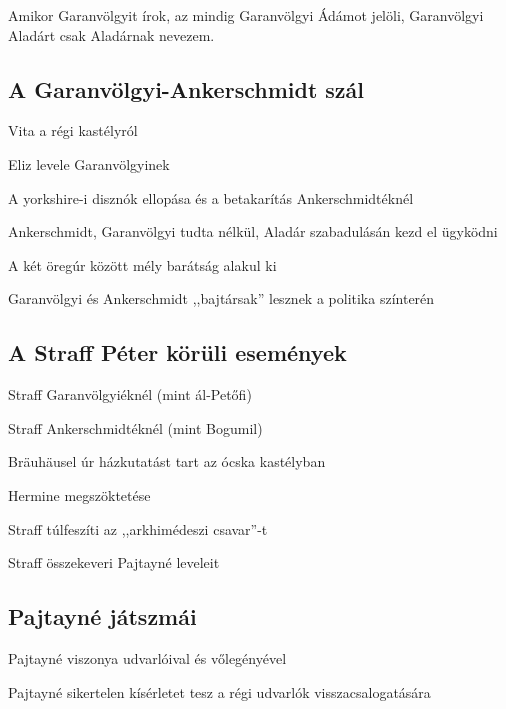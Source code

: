 \documentclass{thesis-ekf}
\begin{document}
    Amikor Garanvölgyit írok, az mindig Garanvölgyi Ádámot jelöli, Garanvölgyi Aladárt csak Aladárnak nevezem.

    \subsection{A Garanvölgyi-Ankerschmidt szál}

    \begin{compactitem}
        \item Vita a régi kastélyról
        \item Eliz levele Garanvölgyinek
        \item A yorkshire-i disznók ellopása és a betakarítás Ankerschmidtéknél
        \item Ankerschmidt, Garanvölgyi tudta nélkül, Aladár szabadulásán kezd el ügyködni
        \item A két öregúr között mély barátság alakul ki
        \item Garanvölgyi és Ankerschmidt ,,bajtársak'' lesznek a politika színterén
    \end{compactitem}

    \subsection{A Straff Péter körüli események}

    \begin{compactitem}
        \item Straff Garanvölgyiéknél (mint ál-Petőfi)
        \item Straff Ankerschmidtéknél (mint Bogumil)
        \item Bräuhäusel úr házkutatást tart az ócska kastélyban
        \item Hermine megszöktetése
        \item Straff túlfeszíti az ,,arkhimédeszi csavar''-t
        \item Straff összekeveri Pajtayné leveleit
    \end{compactitem}

    \subsection{Pajtayné játszmái}

    \begin{compactitem}
        \item Pajtayné viszonya udvarlóival és vőlegényével
        \item Pajtayné sikertelen kísérletet tesz a régi udvarlók visszacsalogatására
    \end{compactitem}
\end{document}
